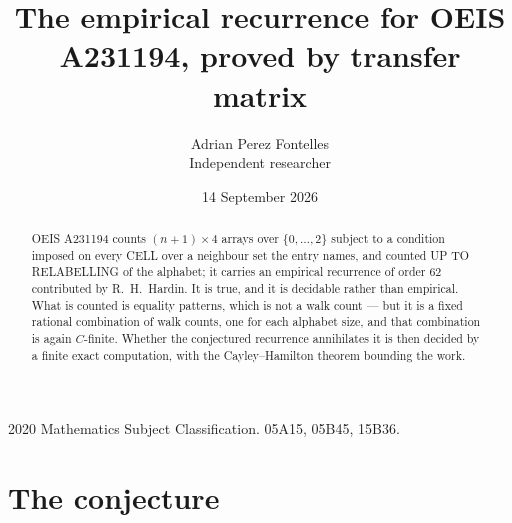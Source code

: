 \documentclass[11pt,a4paper]{article}
\title{The empirical recurrence for OEIS A231194, proved by transfer matrix}
\author{Adrian Perez Fontelles\\ \small Independent researcher}
\date{14 September 2026}
\theoremstyle{plain}
\theoremstyle{definition}
\begin{document}
\maketitle

\begin{abstract}
OEIS A231194 counts $(n+1)\times4$ arrays over $\{0,\dots,2\}$ subject to a condition imposed on
every CELL over a neighbour set the entry names, and counted UP TO RELABELLING of the
alphabet; it carries an empirical recurrence of order $62$ contributed by
R.~H.~Hardin. It is true, and it is decidable rather than empirical. What is counted is
equality patterns, which is not a walk count --- but it is a fixed rational combination of
walk counts, one for each alphabet size, and that combination is again $C$-finite. Whether the
conjectured recurrence annihilates it is then decided by a finite exact computation, with the
Cayley--Hamilton theorem bounding the work.
\end{abstract}

\noindent\small 2020 Mathematics Subject Classification. 05A15, 05B45, 15B36.\normalsize

\section{The conjecture}
\end{document}
